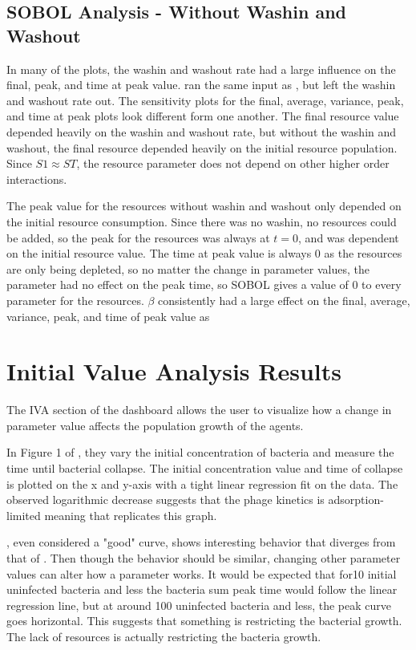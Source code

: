 \subsection{SOBOL Analysis - Without Washin and Washout}
In many of the plots, the washin and washout rate had a large influence on the final, peak, and time at peak value. 
 ran the same input as , but left the washin and washout rate out. 
The sensitivity plots for the final, average, variance, peak, and time at peak plots look different form one another. 
The final resource value depended heavily on the washin and washout rate, but without the washin and washout, the final resource depended heavily on the initial resource population. 
Since $S1 \approx ST$, the resource parameter does not depend on other higher order interactions. 

The peak value for the resources without washin and washout only depended on the initial resource consumption. 
Since there was no washin, no resources could be added, so the peak for the resources was always at $t=0$, and was dependent on the initial resource value. 
The time at peak value is always 0 as the resources are only being depleted, so no matter the change in parameter values, the parameter had no effect on the peak time, so SOBOL gives a value of 0 to every parameter for the resources. 
$\beta$ consistently had a large effect on the final, average, variance, peak, and time of peak value as 


\section{Initial Value Analysis Results}
\label{sec:results:initial_value_analysis}

The IVA section of the dashboard allows the user to visualize how a change in parameter value affects the population growth of the agents. 

In Figure 1 of \citet{mullaExtremeDiversityPhage2024}, they vary the initial concentration of bacteria and measure the time until bacterial collapse. 
The initial concentration value and time of collapse is plotted on the x and y-axis with a tight linear regression fit on the data. 
The observed logarithmic decrease suggests that the phage kinetics is adsorption-limited meaning that 
 replicates this graph. 

, even considered a "good" curve, shows interesting behavior that diverges from that of . 
Then though the behavior should be similar, changing other parameter values can alter how a parameter works. 
It would be expected that for10 initial uninfected bacteria and less the bacteria sum peak time would follow the linear regression line, but at around 100 uninfected bacteria and less, the peak curve goes horizontal. 
This suggests that something is restricting the bacterial growth. 
The lack of resources is actually restricting the bacteria growth. 

